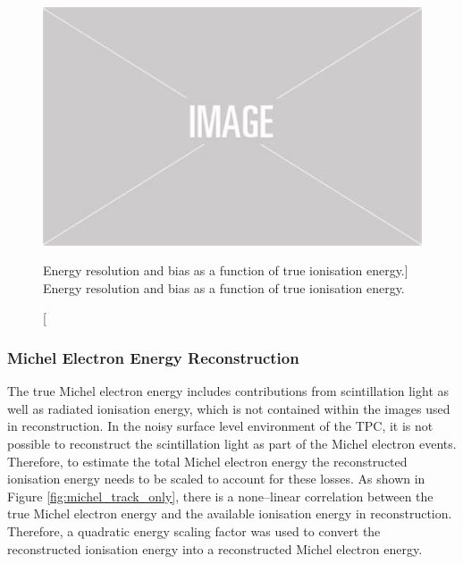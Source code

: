 \begin{figure}
	\centering
	\includegraphics[width=\textwidth]{figures/placeholder.png}
	\caption
	[Energy resolution and bias as a function of true ionisation energy.]
	{Energy resolution and bias as a function of true ionisation energy.}
	\label{fig:res_and_bias_ion}
\end{figure}


\subsubsection{Michel Electron Energy Reconstruction}

The true Michel electron energy includes contributions from scintillation light
as well as radiated ionisation energy, which is not contained within the images
used in reconstruction. In the noisy surface level environment of the
\protodune{} TPC, it is not possible to reconstruct the scintillation light as
part of the Michel electron events. Therefore, to estimate the total Michel 
electron energy the reconstructed ionisation energy needs to be scaled to 
account for these losses. As shown in Figure \ref{fig:michel_track_only},
there is a none--linear correlation between the true Michel electron energy 
and the available ionisation energy in reconstruction. Therefore, a quadratic 
energy scaling factor was used to convert the reconstructed ionisation energy 
into a reconstructed Michel electron energy. 

